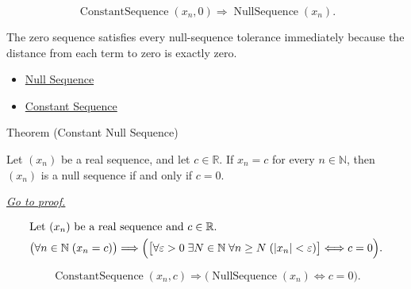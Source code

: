 \begin{remark*}
\[
\operatorname{ConstantSequence}(x_n,0)
\Longrightarrow
\operatorname{NullSequence}(x_n).
\]
\end{remark*}

\begin{remark*}[Interpretation]
The zero sequence satisfies every null-sequence tolerance immediately because
the distance from each term to zero is exactly zero.
\end{remark*}

\begin{dependencies}
\begin{itemize}
  \item \hyperref[def:null-sequence]{Null Sequence}
  \item \hyperref[def:constant-sequence]{Constant Sequence}
\end{itemize}
\end{dependencies}


\begin{theorembox}{Theorem (Constant Null Sequence)}
\begin{theorem}
\label{thm:constant-null-sequence}
Let $(x_n)$ be a real sequence, and let $c \in \mathbb{R}$. If $x_n = c$
for every $n \in \mathbb{N}$, then $(x_n)$ is a null sequence if and only if
$c = 0$.

\smallskip
\noindent
\hyperref[prf:constant-null-sequence]{\textit{Go to proof.}}
\end{theorem}
\end{theorembox}

\begin{remark*}
\[
\begin{aligned}
&\text{Let } (x_n) \text{ be a real sequence and } c \in \mathbb{R}.\\
&\bigl(\forall n \in \mathbb{N}\;(x_n = c)\bigr)
\Longrightarrow
\Bigl(
\bigl[
\forall \varepsilon > 0\;
\exists N \in \mathbb{N}\;
\forall n \ge N\;(|x_n| < \varepsilon)
\bigr]
\Longleftrightarrow c = 0
\Bigr).
\end{aligned}
\]
\end{remark*}

\begin{remark*}
\[
\operatorname{ConstantSequence}(x_n,c)
\Longrightarrow
\bigl(\operatorname{NullSequence}(x_n) \Longleftrightarrow c = 0\bigr).
\]
\end{remark*}

